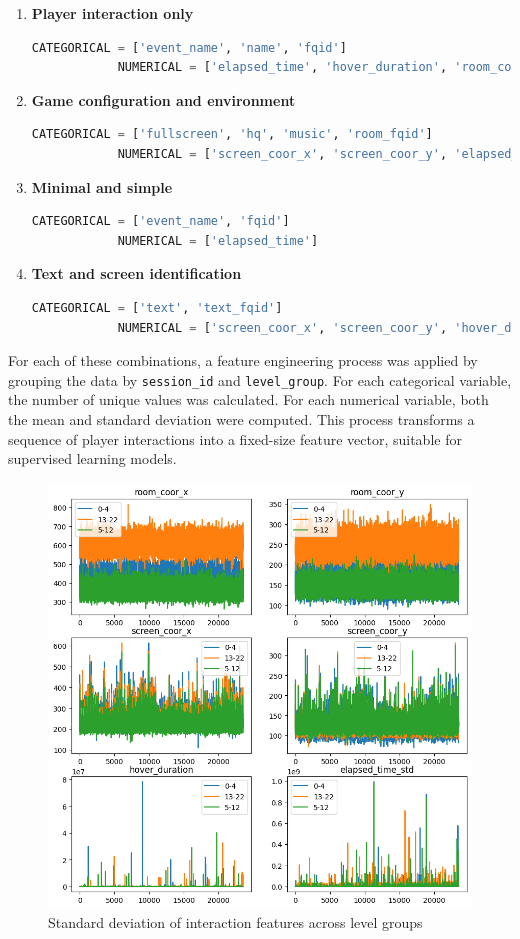 \documentclass[12pt]{article}
\begin{document}
	\begin{enumerate}
		\item \textbf{Player interaction only}
		\begin{lstlisting}[language=Python, caption=Feature set based on player interaction, basicstyle=\ttfamily\small]
			CATEGORICAL = ['event_name', 'name', 'fqid']
			NUMERICAL = ['elapsed_time', 'hover_duration', 'room_coor_x', 'room_coor_y']
		\end{lstlisting}
		
		\item \textbf{Game configuration and environment}
		\begin{lstlisting}[language=Python, caption=Feature set based on configuration and environment, basicstyle=\ttfamily\small]
			CATEGORICAL = ['fullscreen', 'hq', 'music', 'room_fqid']
			NUMERICAL = ['screen_coor_x', 'screen_coor_y', 'elapsed_time']
		\end{lstlisting}
		
		\item \textbf{Minimal and simple}
		\begin{lstlisting}[language=Python, caption=Minimal feature set, basicstyle=\ttfamily\small]
			CATEGORICAL = ['event_name', 'fqid']
			NUMERICAL = ['elapsed_time']
		\end{lstlisting}
		
		\item \textbf{Text and screen identification}
		\begin{lstlisting}[language=Python, caption=Feature set based on text and interface identifiers, basicstyle=\ttfamily\small]
			CATEGORICAL = ['text', 'text_fqid']
			NUMERICAL = ['screen_coor_x', 'screen_coor_y', 'hover_duration']
		\end{lstlisting}
	\end{enumerate}
	
	For each of these combinations, a feature engineering process was applied by grouping the data by \texttt{session\_id} and \texttt{level\_group}. For each categorical variable, the number of unique values was calculated. For each numerical variable, both the mean and standard deviation were computed. This process transforms a sequence of player interactions into a fixed-size feature vector, suitable for supervised learning models.
	
	\begin{figure}[H]
		\centering
		\includegraphics[width=0.5\linewidth]{src/othergrpahics.png}
		\caption{Standard deviation of interaction features across level groups}
		\label{fig:feature-variability}
	\end{figure}
	
\end{document}
